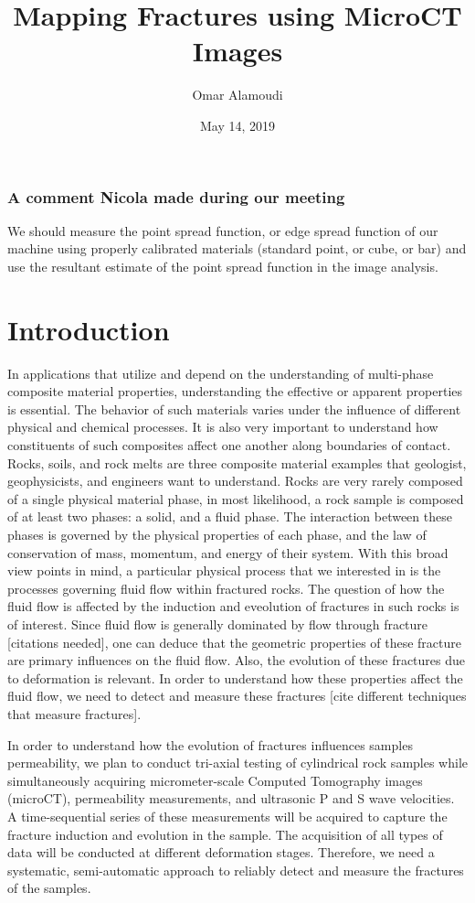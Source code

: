 \documentclass[usletter, 11pt, titlepage]{article}
\title{Mapping Fractures using MicroCT Images}
\author{Omar Alamoudi}
\date{May 14, 2019}
\begin{document}
\maketitle
\subsubsection*{A comment Nicola made during our meeting}
We should measure the point spread function, or edge spread function of our machine using properly calibrated materials (standard point, or cube, or bar) and use the resultant estimate of the point spread function in the image analysis. 


\section{Introduction}
In applications that utilize and depend on the understanding of multi-phase composite material properties, understanding the effective or apparent properties is essential. The behavior of such materials varies under the influence of different physical and chemical processes. It is also very important to understand how constituents of such composites affect one another along boundaries of contact. Rocks, soils, and rock melts are three composite material examples that geologist, geophysicists, and engineers want to understand. Rocks are very rarely composed of a single physical material phase, in most likelihood, a rock sample is composed of at least two phases: a solid, and a fluid phase. The interaction between these phases is governed by the physical properties of each phase, and the law of conservation of mass, momentum, and energy of their system. With this broad view points in mind, a particular physical process that we interested in is the processes governing fluid flow within fractured rocks. The question of how the fluid flow is affected by the induction and eveolution of fractures in such rocks is of interest. Since fluid flow is generally dominated by flow through fracture [citations needed], one can deduce that the geometric properties of these fracture are primary influences on the fluid flow. Also, the evolution of these fractures due to deformation is relevant. In order to understand how these properties affect the fluid flow, we need to detect and measure these fractures [cite different techniques that measure fractures].

In order to understand how the evolution of fractures influences samples permeability, we plan to conduct tri-axial testing of cylindrical rock samples while simultaneously acquiring micrometer-scale Computed Tomography images (microCT), permeability measurements, and ultrasonic P and S wave velocities. A time-sequential series of these measurements will be acquired to capture the fracture induction and evolution in the sample. The acquisition of all types of data will be conducted at different deformation stages. Therefore, we need a systematic, semi-automatic approach to reliably detect and measure the fractures of the samples. 
\end{document}
